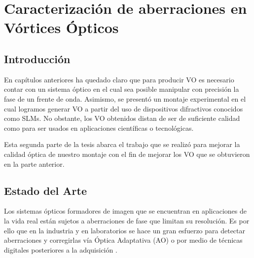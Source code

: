 

\chapter{Caracterización de aberraciones en Vórtices Ópticos}
\label{cha:Car_intro}
\graphicspath{{Figures/chPD_img/}{../Figures/chPD_img/}}
\section{Introducción}
En capítulos anteriores ha quedado claro que para producir VO es
necesario contar con un sistema óptico en el cual sea posible
manipular con precisión la fase de un frente de onda.  Asimismo, se
presentó un montaje experimental en el cual logramos generar VO a
partir del uso de dispositivos difractivos conocidos como SLMs. 
No obstante, los VO obtenidos distan de ser de suficiente calidad como
para ser usados en aplicaciones científicas o tecnológicas. 

Esta segunda parte de la tesis abarca el trabajo que se realizó para
mejorar la calidad óptica de nuestro montaje con el fin de mejorar los
VO que se obtuvieron en la parte anterior. 

\section{Estado del Arte}
\label{sec:ChPD_estado_del_arte}

Los sistemas ópticos formadores de imagen que se encuentran en
aplicaciones de la vida real están sujetos a aberraciones de fase que
limitan su resolución. Es por ello que en la industria y en laboratorios se hace un gran esfuerzo para
detectar aberraciones y corregirlas vía Óptica Adaptativa (AO)  o por
medio de técnicas digitales posteriores a la adquisición
. 

